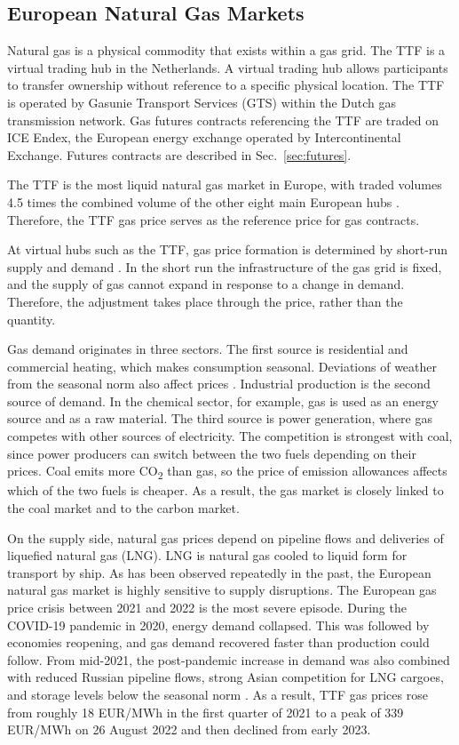\subsection{European Natural Gas Markets}\label{sec:gas-markets}
Natural gas is a physical commodity that exists within a gas grid. The TTF is a virtual trading hub in the Netherlands. A virtual trading hub allows participants to transfer ownership without reference to a specific physical location. The TTF is operated by Gasunie Transport Services (GTS) within the Dutch gas transmission network. Gas futures contracts referencing the TTF are traded on ICE Endex, the European energy exchange operated by Intercontinental Exchange. Futures contracts are described in Sec.~\ref{sec:futures}.

The TTF is the most liquid natural gas market in Europe, with traded volumes 4.5 times the combined volume of the other eight main European hubs \parencite{heatherEuropeanTradedGas2026}. Therefore, the TTF gas price serves as the reference price for gas contracts. 

At virtual hubs such as the TTF, gas price formation is determined by short-run supply and demand \parencite{obadiDRIVINGFUNDAMENTALSNATURAL2020}. In the short run the infrastructure of the gas grid is fixed, and the supply of gas cannot expand in response to a change in demand. Therefore, the adjustment takes place through the price, rather than the quantity.

Gas demand originates in three sectors. The first source is residential and commercial heating, which makes consumption seasonal.
Deviations of weather from the seasonal norm also affect prices \parencite{brownWhatDrivesNatural2008}. Industrial production is the second source of demand. In the chemical sector, for example, gas is used as an energy source and as a raw material. The third source is power generation, where gas competes with other sources of electricity. The competition is strongest with coal, since power producers can switch between the two fuels depending on their prices. Coal emits more CO\textsubscript{2} than gas, so the price of emission allowances affects which of the two fuels is cheaper. As a result, the gas market is closely linked to the coal market and to the carbon market.

On the supply side, natural gas prices depend on pipeline flows and deliveries of liquefied natural gas (LNG). LNG is natural gas cooled to liquid form for transport by ship. As has been observed repeatedly in the past, the European natural gas market is highly sensitive to supply disruptions. The European gas price crisis between 2021 and 2022 is the most severe episode. During the COVID-19 pandemic in 2020, energy demand collapsed. This was followed by economies reopening, and gas demand recovered faster than production could follow. From mid-2021, the post-pandemic increase in demand was also combined with reduced Russian pipeline flows, strong Asian competition for LNG cargoes, and storage levels below the seasonal norm \parencite{heather2022unfortunate}. As a result, TTF gas prices rose from roughly 18 EUR/MWh in the first quarter of 2021 to a peak of 339 EUR/MWh on 26 August 2022 and then declined from early 2023. 

